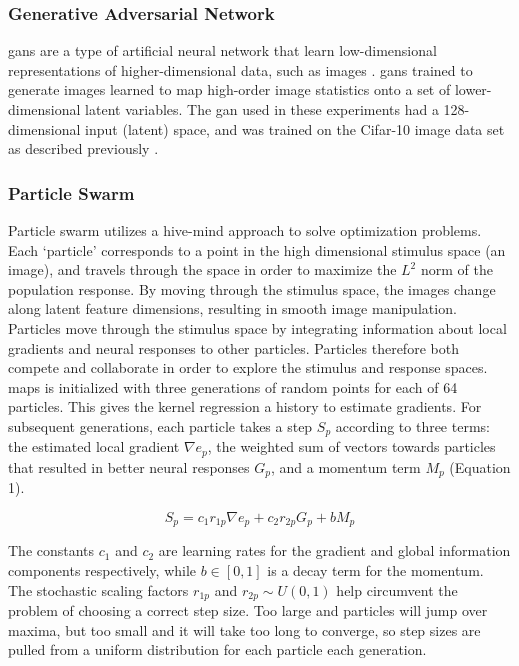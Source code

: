 \subsubsection*{Generative Adversarial Network}
\label{methods:gan}
\Glspl{gan} are a type of artificial neural network that learn low-dimensional representations of higher-dimensional data, such as images \cite{Karras2019}. \glspl{gan} trained to generate images learned to map high-order image statistics onto a set of lower-dimensional latent variables. The \gls{gan} used in these experiments had a 128-dimensional input (latent) space, and was trained on the Cifar-10 image data set as described previously \cite{Fruend2018}. 

\subsubsection*{Particle Swarm}
Particle swarm utilizes a hive-mind approach to solve optimization problems. Each `particle’ corresponds to a point in the high dimensional stimulus space (an image), and travels through the space in order to maximize the $L^2$ norm of the population response. By moving through the stimulus space, the images change along latent feature dimensions, resulting in smooth image manipulation. Particles move through the stimulus space by integrating information about local gradients and neural responses to other particles. Particles therefore both compete and collaborate in order to explore the stimulus and response spaces. \\
\gls{maps} is initialized with three generations of random points for each of 64 particles. This gives the kernel regression a history to estimate gradients. For subsequent generations, each particle takes a step $S_p$ according to three terms: the estimated local gradient $\nabla e_p$,  the weighted sum of vectors towards particles that resulted in better neural responses $G_p$, and a momentum term $M_p$ (Equation 1).

\begin{equation}
	S_p= c_1 r_{1p} \nabla e_p+ c_2  r_{2p} G_p+b M_p
\end{equation}

The constants $c_1$ and $c_2$ are learning rates for the gradient and global information components respectively, while $b \in [0,1]$ is a decay term for the momentum. The stochastic scaling factors $r_{1p}$ and $r_{2p} \sim U(0,1)$ help circumvent the problem of choosing a correct step size. Too large and particles will jump over maxima, but too small and it will take too long to converge, so step sizes are pulled from a uniform distribution for each particle each generation.

